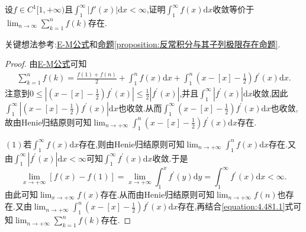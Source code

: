 \documentclass[../../main.tex]{subfiles}%
\begin{document}
\begin{example}
设\(f\in C^1[1,+\infty)\)且\(\int_{1}^{\infty}|f'(x)|\mathrm{d}x<\infty\),证明\(\int_{1}^{\infty}f(x)\mathrm{d}x\)收敛等价于\(\lim_{n\rightarrow\infty}\sum\limits_{k = 1}^{n}f(k)\)存在.
\end{example}
\begin{note}
关键想法参考:\hyperref[theorem:0阶Euler-Maclaurin公式(0阶E-M公式)]{E-M公式}和\hyperref[proposition:反常积分与其子列极限存在命题]{命题\ref{proposition:反常积分与其子列极限存在命题}}.
\end{note}
\begin{proof}

由\hyperref[theorem:0阶Euler-Maclaurin公式(0阶E-M公式)]{E-M公式}可知
\begin{align}\label{equation:4.481.1}
\sum\limits_{k = 1}^n f(k)=\frac{f(1) + f(n)}{2}+\int_1^n f(x)\mathrm{d}x+\int_1^n\left(x - [x] - \frac{1}{2}\right)f^\prime(x)\mathrm{d}x.
\end{align}
注意到\(0\leqslant\left|\left(x - [x] - \frac{1}{2}\right)f^\prime(x)\right|\leqslant\frac{1}{2}\left|f^\prime(x)\right|\),并且\(\int_1^{\infty}\left|f^\prime(x)\right|\mathrm{d}x\)收敛,因此\(\int_1^{\infty}\left|\left(x - [x] - \frac{1}{2}\right)f^\prime(x)\right|\mathrm{d}x\)也收敛.从而\(\int_1^{\infty}\left(x - [x] - \frac{1}{2}\right)f^\prime(x)\mathrm{d}x\)也收敛,故由Henie归结原则可知\(\lim_{n\rightarrow +\infty}\int_1^n\left(x - [x] - \frac{1}{2}\right)f^\prime(x)\mathrm{d}x\)存在.

\((1)\)若\(\int_1^{\infty}f(x)\mathrm{d}x\)存在,则由Henie归结原则可知\(\lim_{n\rightarrow +\infty}\int_1^n f(x)\mathrm{d}x\)存在.又由\(\int_1^{\infty}\left|f^\prime(x)\right|\mathrm{d}x < \infty\)可知\(\int_1^{\infty}f^\prime(x)\mathrm{d}x\)收敛.于是
\[
\lim_{x\rightarrow +\infty}[f(x) - f(1)]=\lim_{x\rightarrow +\infty}\int_1^x f^\prime(y)\mathrm{d}y=\int_1^{\infty}f^\prime(x)\mathrm{d}x < \infty.
\]
由此可知\(\lim_{x\rightarrow +\infty}f(x)\)存在.从而由Henie归结原则可知\(\lim_{n\rightarrow +\infty}f(n)\)也存在.又由\(\lim_{n\rightarrow +\infty}\int_1^n\left(x - [x] - \frac{1}{2}\right)f^\prime(x)\mathrm{d}x\)存在,再结合\eqref{equation:4.481.1}式可知\(\lim_{n\rightarrow +\infty}\sum\limits_{k = 1}^n f(k)\)存在.


\end{proof}
\end{document}
